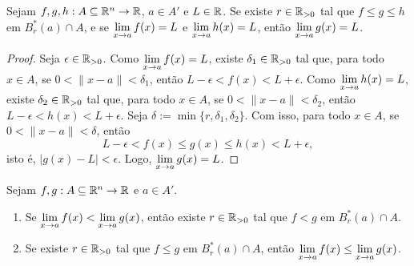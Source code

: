 \begin{theorem}[Confronto]
    Sejam $f,g,h : A \subseteq \mathbb{R}^n \to \mathbb{R}$, $a \in A'$ e $L \in \mathbb{R}$. Se existe $r \in \mathbb{R}_{>0}$ tal que $f \leq g \leq h$ em $B^*_r(a) \cap A$, e se $\displaystyle \lim_{x \to a} f(x) = L$ e $\displaystyle \lim_{x \to a} h(x) = L$, então $\displaystyle \lim_{x \to a} g(x) = L$.
\end{theorem}

\begin{proof}
    Seja $\epsilon \in \mathbb{R}_{>0}$. Como $\displaystyle \lim_{x \to a} f(x) = L$, existe $\delta_1 \in \mathbb{R}_{>0}$ tal que, para todo $x \in A$, se $0<\|x-a\|<\delta_1$, então $L-\epsilon < f(x) < L+\epsilon$. Como $\displaystyle \lim_{x \to a} h(x) = L$, existe $\delta_2 \in \mathbb{R}_{>0}$ tal que, para todo $x \in A$, se $0<\|x-a\|<\delta_2$, então $L-\epsilon < h(x) < L+\epsilon$. Seja $\delta := \min \{r, \delta_1, \delta_2 \}$. Com isso, para todo $x \in A$, se $0<\|x-a\|<\delta$, então 
        \[
            L-\epsilon < f(x) \leq g(x) \leq h(x) < L+\epsilon,
        \]
    isto é, $|g(x) - L| < \epsilon$. Logo, $\displaystyle \lim_{x \to a} g(x) = L$. \blackproof
\end{proof}

\begin{theorem} \label{teo.calc2:conservacao_da_ordem}
    Sejam $f,g : A \subseteq \mathbb{R}^n \to \mathbb{R}$ e $a \in A'$.
        \begin{enumerate}[leftmargin=*, align=left, label=\textbf{(\alph*)}]
            \item Se $\displaystyle \lim_{x \to a} f(x) < \lim_{x \to a} g(x)$, então existe $r \in \mathbb{R}_{>0}$ tal que $f < g$ em $B^*_r(a) \cap A$.
            \item Se existe $r \in \mathbb{R}_{>0}$ tal que $f \leq g$ em $B^*_r(a) \cap A$, então $\displaystyle \lim_{x \to a} f(x) \leq \lim_{x \to a} g(x)$.
        \end{enumerate}
\end{theorem}

